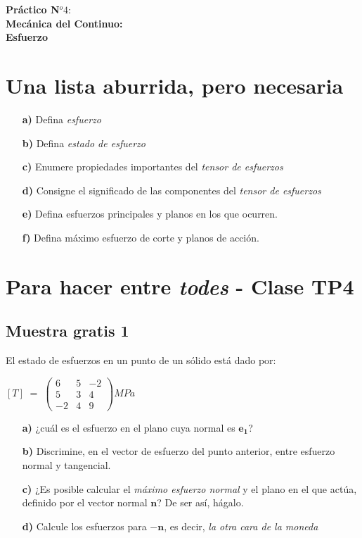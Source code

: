 \documentclass[12pt,a4paper]{article}
\theoremstyle{definition}
\begin{document}
\begin{center}
{\bf \large Práctico N$^o 4:$ \\
Mecánica del Continuo: \\ Esfuerzo}
\end{center}

\bigskip

\section{Una lista aburrida, pero necesaria}
\begin{itemize}
\item[\textbf{a)}] Defina \textit{esfuerzo}
\item[\textbf{b)}] Defina \textit{estado de esfuerzo}
\item[\textbf{c)}] Enumere propiedades importantes del \textit{tensor de esfuerzos}
\item[\textbf{d)}] Consigne el significado de las componentes del \textit{tensor de esfuerzos} 
\item[\textbf{e)}] Defina esfuerzos principales y planos en los que ocurren.
\item[\textbf{f)}] Defina máximo esfuerzo de corte y planos de acción.
\end{itemize}

\section{Para hacer entre \textit{todes} - Clase TP4}
\subsection*{Muestra gratis 1}
El estado de esfuerzos en un punto de un sólido está dado por:
\begin{center}
$[T] \; = \;
\begin{pmatrix}
6 & 5 & -2\\
5 & 3 & 4\\
-2 & 4 & 9
\end{pmatrix}
MPa
$
\end{center}

\begin{itemize}
\item[\textbf{a)}] ¿cuál es el esfuerzo en el plano cuya normal es $\mathbf{e_1}$?
\item[\textbf{b)}] Discrimine, en el vector de esfuerzo del punto anterior, entre esfuerzo normal y tangencial.
\item[\textbf{c)}] ¿Es posible calcular el \textit{máximo esfuerzo normal} y el plano en el que actúa, definido por el vector normal $\mathbf{n}$? De ser así, hágalo.
\item[\textbf{d)}] Calcule los esfuerzos para $-\mathbf{n}$, es decir, \textit{la otra cara de la moneda}
\end{itemize}
\end{document}
